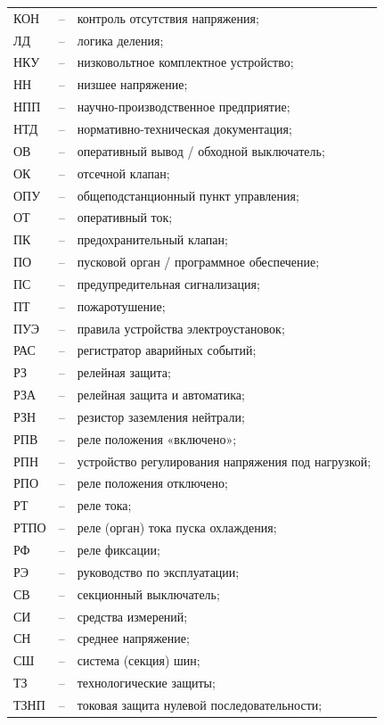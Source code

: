 \begin{longtable}{>{\raggedright\arraybackslash}m{2cm}>{\raggedright\arraybackslash}m{0.5cm}>{\raggedright\arraybackslash}m{20cm}}
КОН & -- & контроль отсутствия напряжения; \\
ЛД & -- & логика деления; \\
НКУ & -- & низковольтное комплектное устройство; \\
НН & -- & низшее напряжение; \\
НПП & -- & научно-производственное предприятие; \\
НТД & -- & нормативно-техническая документация; \\
ОВ & -- & оперативный вывод / обходной выключатель; \\
ОК & -- & отсечной клапан; \\
ОПУ & -- & общеподстанционный пункт управления; \\
ОТ & -- & оперативный ток; \\
ПК & -- & предохранительный клапан; \\
ПО & -- & пусковой орган / программное обеспечение; \\
ПС & -- & предупредительная сигнализация; \\
ПТ & -- & пожаротушение; \\
ПУЭ & -- & правила устройства электроустановок; \\
РАС & -- & регистратор аварийных событий; \\
РЗ & -- & релейная защита; \\
РЗА & -- & релейная защита и автоматика; \\
РЗН & -- & резистор заземления нейтрали; \\
РПВ & -- & реле положения «включено»; \\
РПН & -- & устройство регулирования напряжения под нагрузкой; \\
РПО & -- & реле положения отключено; \\
РТ & -- & реле тока; \\
РТПО & -- & реле (орган) тока пуска охлаждения; \\
РФ & -- & реле фиксации; \\
РЭ & -- & руководство по эксплуатации; \\
СВ & -- & секционный выключатель; \\
СИ & -- & средства измерений; \\
СН & -- & среднее напряжение; \\
СШ & -- & система (секция) шин; \\
ТЗ & -- & технологические защиты; \\
ТЗНП & -- & токовая защита нулевой последовательности; \\

\end{longtable}
